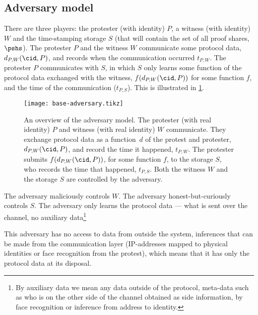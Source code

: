 \subsection{Adversary model}%
\label{formal-adversary-model}


There are three players: the protester (with identity) \(P\), a witness (with 
identity) \(W\) and the time-stamping storage \(S\) (that will contain the set 
of all proof shares, \(\pshs\)).
The protester \(P\) and the witness \(W\) communicate some protocol data,
\(d_{P,W}(\cid, P)\), and records when the communication occurred \(t_{P,W}\).
The protester \(P\) communicates with \(S\), in which \(S\) only learns some 
function of the protocol data exchanged with the witness, \(f(d_{P,W}(\cid, 
  P))\) for some function \(f\), and the time of the communication 
(\(t_{P,S}\)).
This is illustrated in \cref{fig:base-adversary}.

\begin{figure}
  \centering
  \texttt{[image: base-adversary.tikz]}
  \caption{\label{fig:base-adversary}%
    An overview of the adversary model.
    The protester (with real identity) \(P\) and witness (with real identity) 
    \(W\) communicate.
    They exchange protocol data as a function~\(d\) of the protest and 
    protester, \(d_{P,W}(\cid, P)\), and record the time it happened, 
    \(t_{P,W}\).
    The protester submits \(f(d_{P,W}(\cid, P))\), for some function \(f\), to 
    the storage \(S\), who records the time that happened, \(t_{P,S}\).
    Both the witness \(W\) and the storage \(S\) are controlled by the 
    adversary.
  }
\end{figure}

The adversary maliciously controls \(W\).
The adversary honest-but-curiously controls \(S\).
The adversary only learns the protocol data --- \ie what is sent over the 
channel, no auxiliary data\footnote{%
  By auxiliary data we mean any data outside of the protocol, \ie
  meta-data such as who is on the other side of the channel obtained
  as side information, \eg by face recognition or inference from address
  to identity.
}

This adversary has no access to data from outside the system, \eg inferences 
that can be made from the communication layer (\eg IP-addresses mapped to 
physical identities or face recognition from the protest), which means that it 
has only the protocol data at its disposal.


